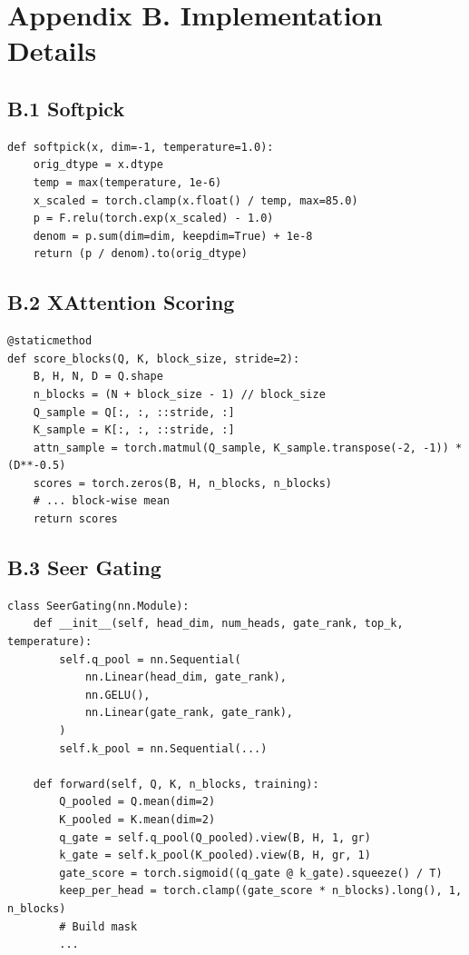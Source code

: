 \section{Appendix B. Implementation Details}

\subsection{B.1 Softpick}

\begin{lstlisting}
def softpick(x, dim=-1, temperature=1.0):
    orig_dtype = x.dtype
    temp = max(temperature, 1e-6)
    x_scaled = torch.clamp(x.float() / temp, max=85.0)
    p = F.relu(torch.exp(x_scaled) - 1.0)
    denom = p.sum(dim=dim, keepdim=True) + 1e-8
    return (p / denom).to(orig_dtype)
\end{lstlisting}

\subsection{B.2 XAttention Scoring}

\begin{lstlisting}
@staticmethod
def score_blocks(Q, K, block_size, stride=2):
    B, H, N, D = Q.shape
    n_blocks = (N + block_size - 1) // block_size
    Q_sample = Q[:, :, ::stride, :]
    K_sample = K[:, :, ::stride, :]
    attn_sample = torch.matmul(Q_sample, K_sample.transpose(-2, -1)) * (D**-0.5)
    scores = torch.zeros(B, H, n_blocks, n_blocks)
    # ... block-wise mean
    return scores
\end{lstlisting}

\subsection{B.3 Seer Gating}

\begin{lstlisting}
class SeerGating(nn.Module):
    def __init__(self, head_dim, num_heads, gate_rank, top_k, temperature):
        self.q_pool = nn.Sequential(
            nn.Linear(head_dim, gate_rank),
            nn.GELU(),
            nn.Linear(gate_rank, gate_rank),
        )
        self.k_pool = nn.Sequential(...)
    
    def forward(self, Q, K, n_blocks, training):
        Q_pooled = Q.mean(dim=2)
        K_pooled = K.mean(dim=2)
        q_gate = self.q_pool(Q_pooled).view(B, H, 1, gr)
        k_gate = self.k_pool(K_pooled).view(B, H, gr, 1)
        gate_score = torch.sigmoid((q_gate @ k_gate).squeeze() / T)
        keep_per_head = torch.clamp((gate_score * n_blocks).long(), 1, n_blocks)
        # Build mask
        ...
\end{lstlisting}

